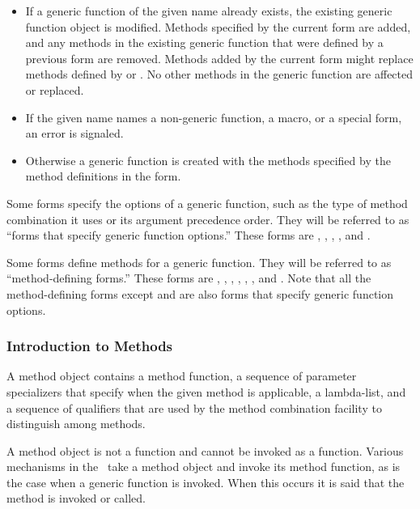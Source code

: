 \begin{itemize}

\item  If a generic function of the given name already exists,
the existing generic function object is modified.  Methods specified
by the current  form are added, and any methods in the
existing generic function that were defined by a previous 
 form are removed.  Methods added by the current 
 form might replace methods defined by  or
.  No other methods in the generic function are affected
or replaced.

\item  If the given name names a non-generic function, a
macro, or a special form, an error is signaled.

\item  Otherwise a generic function is created with the
methods specified by the method definitions in the 
form.

\end{itemize}

Some forms specify the options of a generic function,
such as the type of method combination it uses or its argument
precedence order.  They will be referred to as ``forms that
specify generic function options.'' These forms are ,
, , , and
.

Some forms define methods for a generic function.  They will be
referred to as ``method-defining forms.'' These forms are 
, , , 
, , , and
. Note that all the method-defining forms except 
 and 
are also forms that specify generic function options.

\subsubsection{Introduction to Methods}
\label{Introduction-to-Methods-SECTION}

A method object contains a method function, a sequence of {\bit
parameter specializers\/} that specify when the given method is
applicable, a lambda-list, and a sequence of {\bit qualifiers\/} that
are used by the method combination facility to distinguish among
methods.

A method object is not a function and cannot be invoked as a function. 
Various mechanisms in the \OS\ take a method object and invoke its method
function, as is the case when a generic function is invoked.  When this
occurs it is said that the method is invoked or called.

